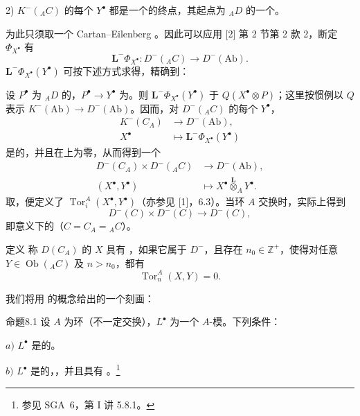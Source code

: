 2) $K^-({}_AC)$ 的每个 $Y^\bullet$ 都是一个的终点，其起点为 ${}_AD$ 的一个。

为此只须取一个 Cartan--Eilenberg 。因此可以应用 [2] 第 2 节第 2 款 2，断定 $\Phi_{X^\bullet}$ 有
\[
\mathbf L^-\Phi_{X^\bullet}:D^-({}_AC)\longrightarrow D^-(\mathrm{Ab}).
\]
 $\mathbf L^-\Phi_{X^\bullet}(Y^\bullet)$ 可按下述方式求得，精确到：

设 $P^\bullet$ 为 ${}_AD$ 的，$P^\bullet\to Y^\bullet$ 为。则 $\mathbf L^-\Phi_{X^\bullet}(Y^\bullet)$ 于 $Q(X^\bullet\otimes P)$；这里按惯例以 $Q$ 表示 $K^-(\mathrm{Ab})\to D^-(\mathrm{Ab})$。因而，对 $D^-({}_AC)$ 的每个 $Y^\bullet$，
\[
\begin{aligned}
K^-(C_A)&\longrightarrow D^-(\mathrm{Ab}),\\
X^\bullet&\longmapsto\mathbf L^-\Phi_{X^\bullet}(Y^\bullet)
\end{aligned}
\]
是的，并且在上为零，从而得到一个
\[
\begin{aligned}
D^-(C_A)\times D^-({}_AC)&\longrightarrow D^-(\mathrm{Ab}),\\
(X^\bullet,Y^\bullet)&\longmapsto X^\bullet\mathbin{\overset{\mathbf L}{\otimes}}_A Y^\bullet.
\end{aligned}
\]
取，便定义了 $\operatorname{Tor}_i^A(X^\bullet,Y^\bullet)$（亦参见 [1]，6.3）。当环 $A$ 交换时，实际上得到
\[
D^-(C)\times D^-(C)\longrightarrow D^-(C),
\]
即意义下的（$C=C_A={}_AC$）。

\begin{SGAresult}{定义}{}
称 $D(C_A)$ 的 $X$ 具有 ，如果它属于 $D^-$，且存在 $n_0\in\mathbb Z^+$，使得对任意 $Y\in\operatorname{Ob}({}_AC)$ 及 $n>n_0$，都有
\[
\operatorname{Tor}_n^A(X,Y)=0.
\]
\end{SGAresult}

我们将用 的概念给出的一个刻画：

\begin{SGAresult}{命题}{8.1}
设 $A$ 为环（不一定交换），$L^\bullet$ 为一个 $A$-模。下列条件：

$a)$ $L^\bullet$ 是的。

$b)$ $L^\bullet$ 是的，，并且具有 。\footnote{参见 SGA~6，第 I 讲 5.8.1。}
\end{SGAresult}


